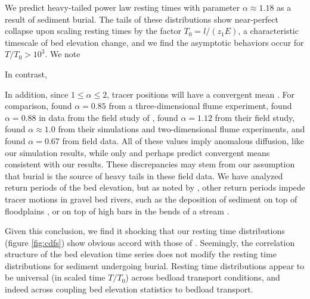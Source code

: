 \documentclass[draft]{agujournal2018}
\begin{document}
We predict heavy-tailed power law resting times with parameter $\alpha \approx 1.18$ as a result of sediment burial.
The tails of these distributions show near-perfect collapse upon scaling resting times by the factor $T_0 = l/(z_1 E)$, a characteristic timescale of bed elevation change, and we find the asymptotic behaviors occur for $T/T_0>10^3$.
We note 


In contrast, \citet{Martin2014} 



In addition, since $1 \leq \alpha \leq 2$, tracer positions will have a convergent mean \citep[e.g.][]{Weeks1998, Bradley2017}.
For comparison, \citet{Martin2012} found $\alpha = 0.85$ from a three-dimensional flume experiment,  \citet{Voepel2013} found $\alpha = 0.88$ in data from the field study of \citet{Habersack2001},
\citet{Phillips2013} found $\alpha = 1.12$ from their field study, \citet{Martin2014} found $\alpha \approx 1.0$ from their simulations and two-dimensional flume experiments, and \citet{Bradley2017} found $\alpha = 0.67$ from field data. 
All of these values imply anomalous diffusion, like our simulation results, while only \citet{Phillips2013} and perhaps \citet{Martin2014} predict convergent means consistent with our results.
These discrepancies may stem from our assumption that burial is the source of heavy tails in these field data. 
We have analyzed return periods of the bed elevation, but as noted by \citet{Bradley2017}, 
other return periods impede tracer motions in gravel bed rivers, such as the deposition of sediment on top of floodplains \citep[e.g.][]{Bradley2013}, or on top of high bars in the bends of a stream \citep[e.g.][]{Bradley2017}.

























Given this conclusion, we find it shocking that our resting time distributions (figure \ref{fig:cdfs}) show obvious accord with those of \citet{Martin2014}.
Seemingly, the correlation structure of the bed elevation time series does not modify the resting time distributions for sediment undergoing burial.
Resting time distributions appear to be universal (in scaled time $T/T_0$) across bedload transport conditions, and indeed across coupling bed elevation statistics to bedload transport.
\end{document}
